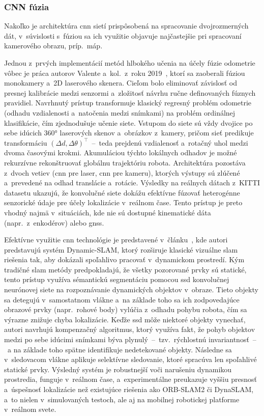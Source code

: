   \subsubsection{CNN fúzia}

    Nakoľko je architektúra \acrshort{cnn} sietí prispôsobená na spracovanie dvojrozmerných dát, v~súvislosti s~fúziou sa ich využitie objavuje najčastejšie pri spracovaní kamerového obrazu, príp.\ máp.
    
    Jednou z~prvých implementácií metód hlbokého učenia na účely fúzie odometrie vôbec je práca autorov Valente a~kol.\ z~roku 2019~\cite{valenteDeepSensorFusion2019}, ktorí sa zaoberali fúziou monokamery a~2D laserového skenera. Cieľom bolo eliminovať závislosť od presnej kalibrácie medzi senzormi a~zložitosť návrhu ručne definovaných fúznych pravidiel. Navrhnutý prístup transformuje klasický regresný problém odometrie (odhadu vzdialenosti a~natočenia medzi snímkami) na problém ordinálnej klasifikácie, čím zjednodušuje učenie siete. Vstupom do siete sú vždy dvojice po sebe idúcich 360° laserových skenov a~obrázkov z~kamery, pričom sieť predikuje transformáciu ${(\Delta d, \Delta \theta)}^{\top}$~--~teda prejdenú vzdialenosť a~rotačný uhol medzi dvoma časovými krokmi. Akumuláciou týchto lokálnych odhadov je možné rekurzívne rekonštruovať globálnu trajektóriu robota. Architektúra pozostáva z~dvoch vetiev (\acrshort{cnn} pre laser, \acrshort{cnn} pre kameru), ktorých výstupy sú zlúčené a~prevedené na odhad translácie a~rotácie. Výsledky na reálnych dátach z~KITTI datasetu ukazujú, že konvolučné siete dokážu efektívne fúzovať heterogénne senzorické údaje pre účely lokalizácie v~reálnom čase. Tento prístup je preto vhodný najmä v~situáciách, kde nie sú dostupné kinematické dáta (napr.\ z~enkodérov) alebo \acrshort{gnss}\@.

    Efektívne využitie \acrshort{cnn} technológie je predstavené v~článku~\cite{xiaoDynamicSLAMSemanticMonocular2019}, kde autori predstavujú systém Dynamic-SLAM, ktorý rozširuje klasické vizuálne \acrshort{slam} riešenia tak, aby dokázali spoľahlivo pracovať v~dynamickom prostredí. Kým tradičné \acrshort{slam} metódy predpokladajú, že všetky pozorované prvky sú statické, tento prístup využíva sémantickú segmentáciu pomocou \acrshort{ssd} konvolučnej neurónovej siete na rozpoznávanie dynamických objektov v~obraze. Tieto objekty sa detegujú v~samostatnom vlákne a~na základe toho sa ich zodpovedajúce obrazové prvky (napr.\ rohové body) vylúčia z~odhadu pohybu robota, čím sa výrazne znižuje chyba lokalizácie. Keďže \acrshort{ssd} môže niektoré objekty vynechať, autori navrhujú kompenzačný algoritmus, ktorý využíva fakt, že pohyb objektov medzi po sebe idúcimi snímkami býva plynulý~--~tzv.\ rýchlostnú invariantnosť~--~a na základe toho spätne identifikuje nedetekované objekty. Následne sa v~sledovacom vlákne aplikuje selektívne sledovanie, ktoré spracúva len spoľahlivé statické prvky. Výsledný systém je robustnejší voči narušeniu dynamikou prostredia, funguje v~reálnom čase, a~experimentálne preukazuje vyššiu presnosť a~úspešnosť lokalizácie než existujúce riešenia ako ORB-SLAM2 či DynaSLAM, a~to nielen v~simulovaných testoch, ale aj na mobilnej robotickej platforme v~reálnom svete.

